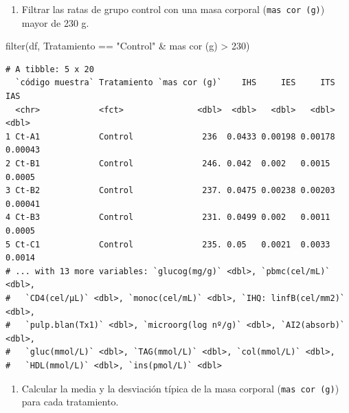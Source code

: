 \documentclass[
  a4paper,
]{scrreport}
\newenvironment{Shaded}{\begin{snugshade}}{\end{snugshade}}
\newcommand{\AttributeTok}[1]{\textcolor[rgb]{0.40,0.45,0.13}{#1}}
\newcommand{\DecValTok}[1]{\textcolor[rgb]{0.68,0.00,0.00}{#1}}
\newcommand{\FunctionTok}[1]{\textcolor[rgb]{0.28,0.35,0.67}{#1}}
\newcommand{\NormalTok}[1]{\textcolor[rgb]{0.00,0.23,0.31}{#1}}
\newcommand{\SpecialCharTok}[1]{\textcolor[rgb]{0.37,0.37,0.37}{#1}}
\newcommand{\StringTok}[1]{\textcolor[rgb]{0.13,0.47,0.30}{#1}}
\providecommand{\tightlist}{%
  \setlength{\itemsep}{0pt}\setlength{\parskip}{0pt}}\usepackage{longtable,booktabs,array}
\theoremstyle{definition}
\theoremstyle{definition}
\theoremstyle{remark}
\begin{document}
\begin{enumerate}
\def\labelenumi{\alph{enumi}.}
\setcounter{enumi}{3}
\tightlist
\item
  Filtrar las ratas de grupo control con una masa corporal
  (\texttt{mas\ cor\ (g)}) mayor de 230 g.
\end{enumerate}

\begin{tcolorbox}[enhanced jigsaw, left=2mm, colframe=quarto-callout-note-color-frame, breakable, colback=white, title=\textcolor{quarto-callout-note-color}{\faInfo}\hspace{0.5em}{Solución}, toprule=.15mm, arc=.35mm, leftrule=.75mm, colbacktitle=quarto-callout-note-color!10!white, opacityback=0, coltitle=black, opacitybacktitle=0.6, rightrule=.15mm, bottomrule=.15mm, bottomtitle=1mm, toptitle=1mm, titlerule=0mm]

\begin{Shaded}
\begin{Highlighting}[]
\FunctionTok{filter}\NormalTok{(df, Tratamiento }\SpecialCharTok{==} \StringTok{"Control"} \SpecialCharTok{\&} \StringTok{\textasciigrave{}}\AttributeTok{mas cor (g)}\StringTok{\textasciigrave{}} \SpecialCharTok{\textgreater{}} \DecValTok{230}\NormalTok{)}
\end{Highlighting}
\end{Shaded}

\begin{verbatim}
# A tibble: 5 x 20
  `código muestra` Tratamiento `mas cor (g)`    IHS     IES     ITS     IAS
  <chr>            <fct>               <dbl>  <dbl>   <dbl>   <dbl>   <dbl>
1 Ct-A1            Control              236  0.0433 0.00198 0.00178 0.00043
2 Ct-B1            Control              246. 0.042  0.002   0.0015  0.0005 
3 Ct-B2            Control              237. 0.0475 0.00238 0.00203 0.00041
4 Ct-B3            Control              231. 0.0499 0.002   0.0011  0.0005 
5 Ct-C1            Control              235. 0.05   0.0021  0.0033  0.0014 
# ... with 13 more variables: `glucog(mg/g)` <dbl>, `pbmc(cel/mL)` <dbl>,
#   `CD4(cel/µL)` <dbl>, `monoc(cel/mL)` <dbl>, `IHQ: linfB(cel/mm2)` <dbl>,
#   `pulp.blan(Tx1)` <dbl>, `microorg(log nº/g)` <dbl>, `AI2(absorb)` <dbl>,
#   `gluc(mmol/L)` <dbl>, `TAG(mmol/L)` <dbl>, `col(mmol/L)` <dbl>,
#   `HDL(mmol/L)` <dbl>, `ins(pmol/L)` <dbl>
\end{verbatim}

\end{tcolorbox}

\begin{enumerate}
\def\labelenumi{\alph{enumi}.}
\setcounter{enumi}{4}
\tightlist
\item
  Calcular la media y la desviación típica de la masa corporal
  (\texttt{mas\ cor\ (g)}) para cada tratamiento.
\end{enumerate}
\end{document}
